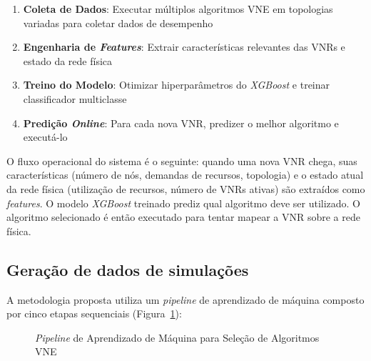 \documentclass[conference]{IEEEtran}
\begin{document}
\begin{enumerate}
    \item \textbf{Coleta de Dados}: Executar múltiplos algoritmos VNE em topologias variadas para coletar dados de desempenho
    \item \textbf{Engenharia de \textit{Features}}: Extrair características relevantes das VNRs e estado da rede física
    \item \textbf{Treino do Modelo}: Otimizar hiperparâmetros do \textit{XGBoost} e treinar classificador multiclasse
    \item \textbf{Predição \textit{Online}}: Para cada nova VNR, predizer o melhor algoritmo e executá-lo
\end{enumerate}

O fluxo operacional do sistema é o seguinte: quando uma nova VNR chega, suas características (número de nós, demandas de recursos, topologia) e o estado atual da rede física (utilização de recursos, número de VNRs ativas) são extraídos como \textit{features}.
O modelo \textit{XGBoost} treinado prediz qual algoritmo deve ser utilizado. O algoritmo selecionado é então executado para tentar mapear a VNR sobre a rede física.

\subsection{Geração de dados de simulações}

A metodologia proposta utiliza um \textit{pipeline} de aprendizado de máquina composto por cinco etapas sequenciais (Figura~\ref{fig:pipeline}):

\begin{figure}[H]
    \centering
    \caption{\textit{Pipeline} de Aprendizado de Máquina para Seleção de Algoritmos VNE}
    \label{fig:pipeline}
\end{figure}
\end{document}
